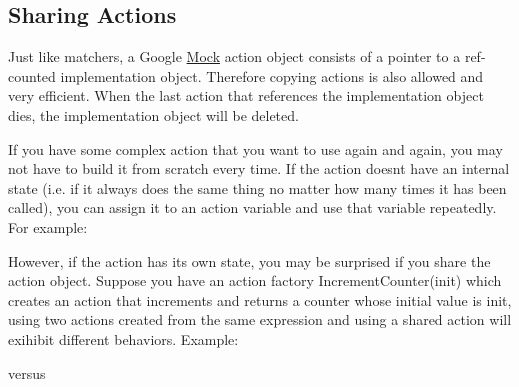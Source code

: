 \subsection*{Sharing Actions}

Just like matchers, a Google \mbox{\hyperlink{classMock}{Mock}} action object consists of a pointer to a ref-\/counted implementation object. Therefore copying actions is also allowed and very efficient. When the last action that references the implementation object dies, the implementation object will be deleted.

If you have some complex action that you want to use again and again, you may not have to build it from scratch every time. If the action doesn\textquotesingle{}t have an internal state (i.\+e. if it always does the same thing no matter how many times it has been called), you can assign it to an action variable and use that variable repeatedly. For example\+:


\begin{DoxyCode}{0}
\end{DoxyCode}


However, if the action has its own state, you may be surprised if you share the action object. Suppose you have an action factory {\ttfamily Increment\+Counter(init)} which creates an action that increments and returns a counter whose initial value is {\ttfamily init}, using two actions created from the same expression and using a shared action will exihibit different behaviors. Example\+:


\begin{DoxyCode}{0}
\end{DoxyCode}


versus


\begin{DoxyCode}{0}
\DoxyCodeLine{}
\end{DoxyCode}



